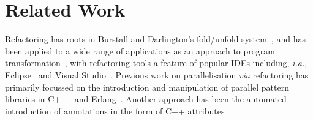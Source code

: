 \section{Related Work}




Refactoring has roots in Burstall and Darlington's fold/unfold system~\cite{darlington77}, and has been applied to a wide range of applications as an approach to program transformation~\cite{mens_refactoring}, with refactoring tools a feature of popular IDEs including, \textit{i.a.}, Eclipse~\cite{EclipseWeb} and Visual Studio~\cite{VisualStudioWeb}.
Previous work on parallelisation \textit{via} refactoring has primarily focussed on the introduction and manipulation of parallel pattern libraries in C++~\cite{brownagricultural,DBLP:conf/pdp/JanjicBMHDAG16} and Erlang~\cite{hlpp,DBLP:journals/cai/BarwellBHTB16}. Another approach
has been the automated introduction of annotations in the form of
C++ attributes~\cite{rio:2018}.

